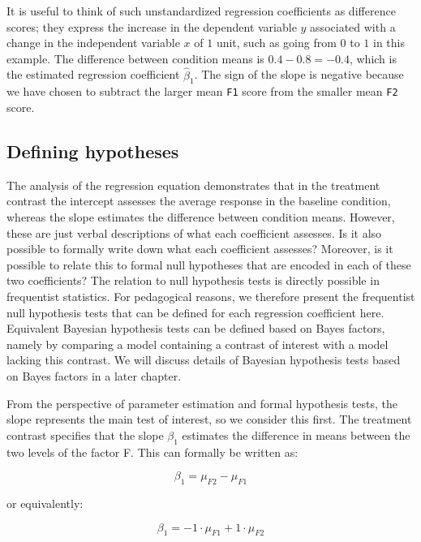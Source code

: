 \documentclass[12pt,]{krantz}
\theoremstyle{definition}
\theoremstyle{definition}
\theoremstyle{definition}
\theoremstyle{remark}
\begin{document}
It is useful to think of such unstandardized regression coefficients as difference scores; they express the increase in the dependent variable \(y\) associated with a change in the independent variable \(x\) of \(1\) unit, such as going from \(0\) to \(1\) in this example. The difference between condition means is \(0.4 - 0.8 = -0.4\), which is the estimated regression coefficient \(\hat{\beta}_1\). The sign of the slope is negative because we have chosen to subtract the larger mean \texttt{F1} score from the smaller mean \texttt{F2} score.

\hypertarget{inverseMatrix}{%
\subsection{Defining hypotheses}\label{inverseMatrix}}

The analysis of the regression equation demonstrates that in the treatment contrast the intercept assesses the average response in the baseline condition, whereas the slope estimates the difference between condition means. However, these are just verbal descriptions of what each coefficient assesses. Is it also possible to formally write down what each coefficient assesses? Moreover, is it possible to relate this to formal null hypotheses that are encoded in each of these two coefficients? The relation to null hypothesis tests is directly possible in frequentist statistics. For pedagogical reasons, we therefore present the frequentist null hypothesis tests that can be defined for each regression coefficient here. Equivalent Bayesian hypothesis tests can be defined based on Bayes factors, namely by comparing a model containing a contrast of interest with a model lacking this contrast. We will discuss details of Bayesian hypothesis tests based on Bayes factors in a later chapter.

From the perspective of parameter estimation and formal hypothesis tests, the slope represents the main test of interest, so we consider this first. The treatment contrast specifies that the slope \(\beta_1\) estimates the difference in means between the two levels of the factor F. This can formally be written as:

\begin{equation}
\beta_1 = \mu_{F2} - \mu_{F1}
\end{equation}

or equivalently:

\begin{equation}
\beta_1 = - 1 \cdot \mu_{F1} + 1 \cdot \mu_{F2}
\end{equation}
\end{document}
